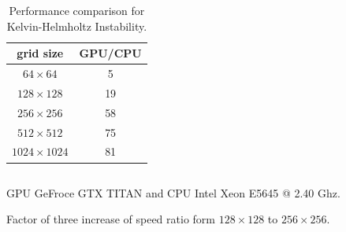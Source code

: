 \documentclass{beamer}
\begin{document}
\begin{frame}[fragile]
\begin{columns}
\begin{column}{0.5\textwidth}
\begin{table}[htbp]%
\caption{Performance comparison for Kelvin-Helmholtz Instability.} %
\begin{tabular*}{\textwidth}{@{\extracolsep{\fill}} cc}
\\ 
\hline 
\hline 
grid size & GPU/CPU  \\
\hline
$64\times64$  & 5 \\
$128\times128$  & 19 \\
$256\times256$  & 58 \\
$512\times512$  & 75 \\
$1024\times1024$  & 81 \\
\hline
\end{tabular*}
\end{table}
\end{column}
\end{columns}
\bei
\item GPU GeFroce GTX TITAN and CPU Intel Xeon E5645 @ 2.40 Ghz.
\item Factor of three increase of speed ratio form $128\times128$ to $256\times256$.
\ebi

\end{frame}

\end{document}
